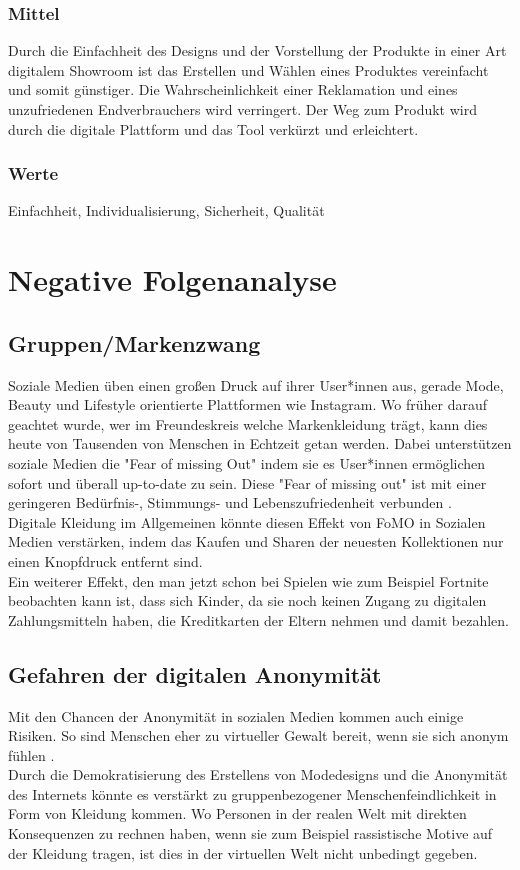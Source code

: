 \documentclass{article}
\begin{document}
\subsubsection{Mittel}
Durch die Einfachheit des Designs und der Vorstellung der Produkte in einer Art digitalem Showroom ist das Erstellen und Wählen eines Produktes vereinfacht und somit günstiger. Die Wahrscheinlichkeit einer Reklamation und eines unzufriedenen Endverbrauchers wird verringert. Der Weg zum Produkt wird durch die digitale Plattform und das Tool verkürzt und erleichtert.
\subsubsection{Werte}
Einfachheit, Individualisierung, Sicherheit, Qualität

\newpage

\section{Negative Folgenanalyse}

\subsection{Gruppen/Markenzwang}
Soziale Medien üben einen großen Druck auf ihrer User*innen aus, gerade Mode, Beauty und Lifestyle orientierte Plattformen wie Instagram. Wo früher darauf geachtet wurde, wer im Freundeskreis welche Markenkleidung trägt, kann dies heute von Tausenden von Menschen in Echtzeit getan werden. Dabei unterstützen soziale Medien die "Fear of missing Out" indem sie es User*innen ermöglichen sofort und überall up-to-date zu sein. Diese "Fear of missing out" ist mit einer geringeren Bedürfnis-, Stimmungs- und Lebenszufriedenheit verbunden \cite{Przybylski2013}. 
\\[2ex]
Digitale Kleidung im Allgemeinen könnte diesen Effekt von FoMO in Sozialen Medien verstärken, indem das Kaufen und Sharen der neuesten Kollektionen nur einen Knopfdruck entfernt sind.
\\[2ex]
Ein weiterer Effekt, den man jetzt schon bei Spielen wie zum Beispiel Fortnite beobachten kann ist, dass sich Kinder, da sie noch keinen Zugang zu digitalen Zahlungsmitteln haben, die Kreditkarten der Eltern nehmen und damit bezahlen.

\subsection{Gefahren der digitalen Anonymität}
Mit den Chancen der Anonymität in sozialen Medien kommen auch einige Risiken. So sind Menschen eher zu virtueller Gewalt bereit, wenn sie sich anonym fühlen \cite{1971-08069-001}.
\\[2ex]
Durch die Demokratisierung des Erstellens von Modedesigns und die Anonymität des Internets könnte es verstärkt zu gruppenbezogener Menschenfeindlichkeit in Form von Kleidung kommen. Wo Personen in der realen Welt mit direkten Konsequenzen zu rechnen haben, wenn sie zum Beispiel rassistische Motive auf der Kleidung tragen, ist dies in der virtuellen Welt nicht unbedingt gegeben.
\end{document}
